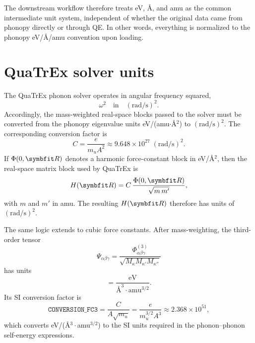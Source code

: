 The downstream workflow therefore treats eV, \AA, and amu as the common
intermediate unit system, independent of whether the original data came
from phonopy directly or through QE.  In other words, everything is
normalized to the phonopy eV/\AA/amu convention upon loading.

\section{QuaTrEx solver units}
\label{sec:solver_units}

The QuaTrEx phonon solver operates in angular frequency squared,
\begin{equation}
  \omega^2 \quad \text{in} \quad (\mathrm{rad/s})^2.
\end{equation}
Accordingly, the mass-weighted real-space blocks passed to the solver
must be converted from the phonopy eigenvalue units
eV/(amu$\cdot$\AA$^2$) to $(\mathrm{rad/s})^2$.  The corresponding
conversion factor is
\begin{equation}\label{eq:conversion}
  C = \frac{e}{m_u A^2}
  \approx 9.648 \times 10^{27}\;\mathrm{(rad/s)^2}.
\end{equation}
If $\Phi(0,\vc{R})$ denotes a harmonic force-constant block in
eV/\AA$^2$, then the real-space matrix block used by QuaTrEx is
\begin{equation}
  H(\vc{R})
  = C\,
    \frac{\Phi(0,\vc{R})}{\sqrt{m\,m'}},
\end{equation}
with $m$ and $m'$ in amu.  The resulting $H(\vc{R})$ therefore has units
of $(\mathrm{rad/s})^2$.

The same logic extends to cubic force constants.  After mass-weighting,
the third-order tensor
\begin{equation}
  \Psi_{\alpha\beta\gamma}
  = \frac{\Phi^{(3)}_{\alpha\beta\gamma}}
         {\sqrt{M_\kappa M_{\kappa'} M_{\kappa''}}}
\end{equation}
has units
\begin{equation}
  [\Psi] = \frac{\mathrm{eV}}
                 {\mathrm{\si{\angstrom}}^3\cdot\mathrm{amu}^{3/2}}.
\end{equation}
Its SI conversion factor is
\begin{equation}\label{eq:conversion_fc3}
  \texttt{CONVERSION\_FC3}
  = \frac{C}{A\sqrt{m_u}}
  = \frac{e}{m_u^{3/2} A^3}
  \approx 2.368\times10^{51},
\end{equation}
which converts
eV/(\AA$^3\cdot$amu$^{3/2}$) to the SI units required in the
phonon--phonon self-energy expressions.

